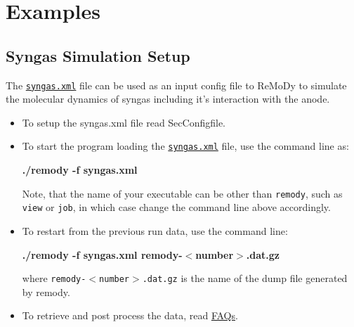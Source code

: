 \hypertarget{Examples_SecExamples}{}\section{Examples}\label{Examples_SecExamples}
\hypertarget{Examples_ExSyngas}{}\subsection{Syngas Simulation Setup}\label{Examples_ExSyngas}
The \href{../syngas.xml}{\tt syngas.xml} file can be used as an input config file to ReMoDy to simulate the molecular dynamics of syngas including it's interaction with the anode.

\begin{itemize}
\item To setup the syngas.xml file read SecConfigfile.\end{itemize}


\begin{itemize}
\item To start the program loading the \href{../syngas.xml}{\tt syngas.xml} file, use the command line as: \par
\par
{\bf  ./remody -f syngas.xml }\par
\par
 Note, that the name of your executable can be other than {\tt remody}, such as {\tt view} or {\tt job}, in which case change the command line above accordingly.\end{itemize}


\begin{itemize}
\item To restart from the previous run data, use the command line: \par
\par
{\bf  ./remody -f syngas.xml remody-$<$number$>$.dat.gz }\par
\par
 where {\tt remody-$<$number$>$.dat.gz} is the name of the dump file generated by remody.\end{itemize}


\begin{itemize}
\item To retrieve and post process the data, read \hyperlink{FAQ_SecFAQ}{FAQs}. \end{itemize}
